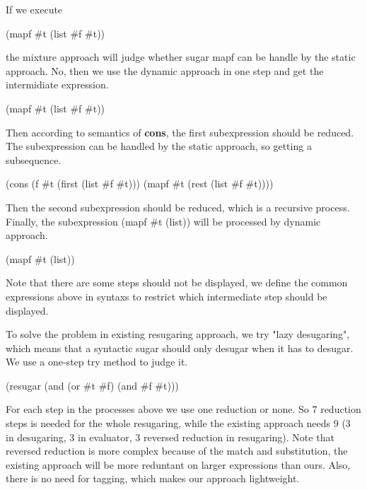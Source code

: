 {If we execute
\begin{Codes}
(mapf \#t (list \#f \#t))
\end{Codes}
 the mixture approach will judge whether sugar mapf can be handle by the static approach. No, then we use the dynamic approach in one step and get the intermidiate expression.
\begin{Codes}
    (mapf \#t (list \#f \#t))
\end{Codes}
Then according to semantics of {\bfseries cons}, the first subexpression should be reduced. The subexpression can be handled by the static approach, so getting a subsequence.
\begin{Codes}
    (cons (f \#t (first (list \#f \#t))) (mapf \#t (rest (list \#f \#t))))
\end{Codes}
Then the second subexpression should be reduced, which is a recursive process. Finally, the subexpression (mapf \#t (list)) will be processed by dynamic approach.
\begin{Codes}
   (mapf \#t (list))
\end{Codes}
Note that there are some steps should not be displayed, we define the common expressions above in syntaxs to restrict which intermediate step should be displayed.
}

To solve the problem in existing resugaring approach, we try "lazy desugaring", which means that a syntactic sugar should only desugar when it has to desugar. We use a one-step try method to judge it.
\begin{Codes}
    (resugar (and (or \#t \#f) (and \#f \#t)))
 
 
 
 
 
 
\end{Codes} 

For each step in the processes above we use one reduction or none. So 7 reduction steps is needed for the whole resugaring, while the existing approach needs 9 (3 in desugaring, 3 in evaluator, 3 reversed reduction in resugaring). Note that reversed reduction is more complex because of the match and substitution, the existing approach will be more reduntant on larger expressions than ours. Also, there is no need for tagging, which makes our approach lightweight.

